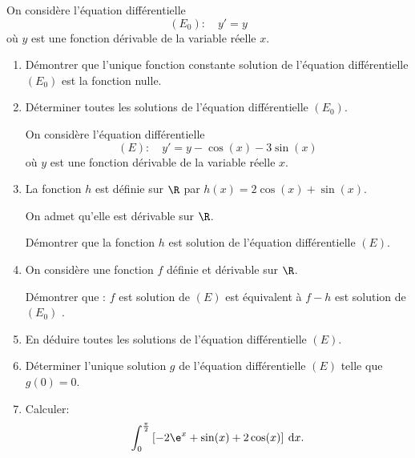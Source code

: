 \medskip

On considère l'équation différentielle 
\[\left(E_0\right) :\quad  y' = y\]
où $y$ est une fonction dérivable de la variable réelle $x$.

\medskip

\begin{enumerate}
\item Démontrer que l'unique fonction constante solution de l'équation différentielle 
$\left(E_0\right)$ est la fonction nulle.
\item Déterminer toutes les solutions de l'équation différentielle $\left(E_0\right)$.

On considère l'équation différentielle 
\[(E) :\quad  y' = y - \cos (x) - 3\sin (x)\]
où $y$ est une fonction dérivable de la variable réelle $x$.

\item La fonction $h$ est définie sur $\R$ par $h(x) = 2 \cos (x) + \sin (x)$.

On admet qu'elle est dérivable sur $\R$.

Démontrer que la fonction $h$ est solution de l'équation différentielle $(E)$.
\item On considère une fonction $f$ définie et dérivable sur $\R$.

Démontrer que : \og $f$ est solution de $(E)$ \fg{} est équivalent à \og $f - h$ est solution de $\left(E_0\right)$ \fg.
\item En déduire toutes les solutions de l'équation différentielle $(E)$.
\item Déterminer l'unique solution $g$ de l'équation différentielle $(E)$ telle que $g(0) = 0$.
\item Calculer:
\[\displaystyle\int_0^{\frac{\pi}{2}} \left[-2\e^x + \sin (x) + 2\cos (x)\right]\:\text{d}x.\]
\end{enumerate}

\medskip
